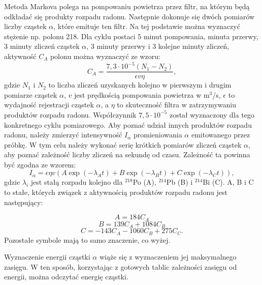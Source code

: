 \documentclass[10pt,a4paper]{article}
\begin{document}
Metoda Markova \cite{m1} polega na pompowaniu powietrza przez filtr, na którym będą odkładać się produkty rozpadu radonu. Następnie dokonuje się dwóch pomiarów liczby cząstek $\alpha$, które emituje ten filtr. Na tej podstawie można wyznaczyć stężenie np. polonu 218. Dla cyklu postaci 5 minut pompowania, minuta przerwy, 3 minuty zliczeń cząstek $\alpha$, 3 minuty przerwy i 3 kolejne minuty zliczeń, aktywność $C_{A}$ polonu można wyznaczyć ze wzoru:
\begin{equation}
C_{A}=\frac{7,3\cdot10^{-5}\left(N_{1}-N_{2}\right)}{\epsilon v \eta},
\end{equation}
gdzie $N_{1}$ i $N_{2}$ to liczba zliczeń uzyskanych kolejno w pierwszym i drugim pomiarze cząstek $\alpha$, $v$ jest prędkością pompowania powietrza w m$^3$/s, $\epsilon$ to wydajność rejestracji cząstek $\alpha$, a $\eta$ to skuteczność filtra w zatrzymywaniu produktów rozpadu radonu. Współczynnik $7,5\cdot10^{-5}$ został wyznaczony dla tego konkretnego cyklu pomiarowego. 
Aby poznać udział innych produktów rozpadu radonu, należy zmierzyć intensywność $I_{\alpha}$ promieniowania $\alpha$ emitowanego przez próbkę. W tym celu należy wykonać serię krótkich pomiarów zliczeń cząstek $\alpha$, aby poznać zależność liczby zliczeń na sekundę od czasu. Zależność ta powinna być zgodna ze wzorem:
\begin{equation}
I_{\alpha}=\epsilon\eta v \left(A \exp(-\lambda_{A}t)+B \exp(-\lambda_{B}t)+C \exp(-\lambda_{C}t) \right),
\end{equation}
gdzie $\lambda_{i}$ jest stałą rozpadu kolejno dla $^{218}$Po (A), $^{214}$Pb (B) i $^{214}$Bi (C). A, B i C to stałe, których związek z aktywnością produktów rozpadu radonu jest następujący:

\begin{equation}
A=184C_{A} 
\end{equation}
\begin{equation}
B=139C_{A}+1084C_{B}
\end{equation}
\begin{equation}
C=-143C_{A} -1060 C_{B} + 275 C_{C}.
\end{equation} 
Pozostałe symbole mają to samo znaczenie, co wyżej.

Wyznaczenie energii cząstki $\alpha$ wiąże się z wyznaczeniem jej maksymalnego zasięgu. W ten sposób, korzystając z gotowych tablic zależności zasięgu od energii, można odczytać energię cząstki.
\end{document}
